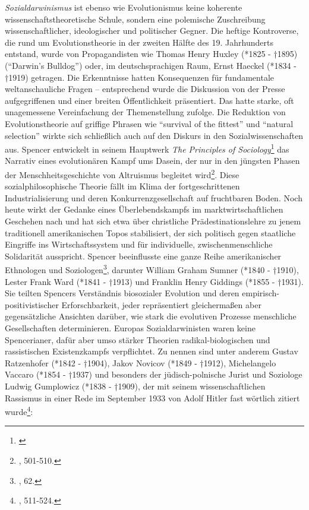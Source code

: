 \documentclass[openany,twoside,twocolumn]{book}
\let\rmarkdownfootnote\footnote%
\def\footnote{\protect\rmarkdownfootnote}
\begin{document}
\emph{Sozialdarwinismus} ist ebenso wie Evolutionismus keine koherente
wissenschaftstheoretische Schule, sondern eine polemische Zuschreibung
wissenschaftlicher, ideologischer und politischer Gegner. Die heftige
Kontroverse, die rund um Evolutionstheorie in der zweiten Hälfte des 19.
Jahrhunderts entstand, wurde von Propagandisten wie Thomas Henry Huxley
(*1825 - †1895) (``Darwin's Bulldog'') oder, im deutschsprachigen Raum,
Ernst Haeckel (*1834 - †1919) getragen. Die Erkenntnisse hatten
Konsequenzen für fundamentale weltanschauliche Fragen -- entsprechend
wurde die Diskussion von der Presse aufgegriffenen und einer breiten
Öffentlichkeit präsentiert. Das hatte starke, oft unagemessene
Vereinfachung der Themenstellung zufolge. Die Reduktion von
Evolutionstheorie auf griffige Phrasen wie ``survival of the fittest''
und ``natural selection'' wirkte sich schließlich auch auf den Diskurs
in den Sozialwissenschaften aus. Spencer entwickelt in seinem Hauptwerk
\emph{The Principles of Sociology}\footnote{\textcite{SpencerHerbertSpencerPrinciples1898}}
das Narrativ eines evolutionären Kampf ums Dasein, der nur in den
jüngsten Phasen der Menschheitsgeschichte von Altruismus begleitet
wird\footnote{\textcite{petermann_geschichte_2004}, 501-510.}. Diese
sozialphilosophische Theorie fällt im Klima der fortgeschrittenen
Industrialisierung und deren Konkurrenzgesellschaft auf fruchtbaren
Boden. Noch heute wirkt der Gedanke eines Überlebendskampfs im
marktwirtschaftlichen Geschehen nach und hat sich etwa über christliche
Prädestinationslehre zu jenem traditionell amerikanischen Topos
stabilisiert, der sich politisch gegen staatliche Eingriffe ins
Wirtschaftssystem und für individuelle, zwischenmenschliche Solidarität
ausspricht. Spencer beeinflusste eine ganze Reihe amerikanischer
Ethnologen und Soziologen\footnote{\textcite{smith_cultural_1992}, 62.},
darunter William Graham Sumner (*1840 - †1910), Lester Frank Ward (*1841
- †1913) und Franklin Henry Giddings (*1855 - †1931). Sie teilten
Spencers Verständnis biosozialer Evolution und deren
empirisch-positivistischer Erforschbarkeit, jeder repräsentiert
gleichermaßen aber gegensätzliche Ansichten darüber, wie stark die
evolutiven Prozesse menschliche Gesellschaften determinieren. Europas
Sozialdarwinisten waren keine Spencerianer, dafür aber umso stärker
Theorien radikal-biologischen und rassistischen Existenzkampfs
verpflichtet. Zu nennen sind unter anderem Gustav Ratzenhofer (*1842 -
†1904), Jakov Novicov (*1849 - †1912), Michelangelo Vaccaro (*1854 -
†1937) und besonders der jüdisch-polnische Jurist und Soziologe Ludwig
Gumplowicz (*1838 - †1909), der mit seinem wissenschaftlichen Rassismus
in einer Rede im September 1933 von Adolf Hitler fast wörtlich zitiert
wurde\footnote{\textcite{petermann_geschichte_2004}, 511-524.}:
\end{document}
